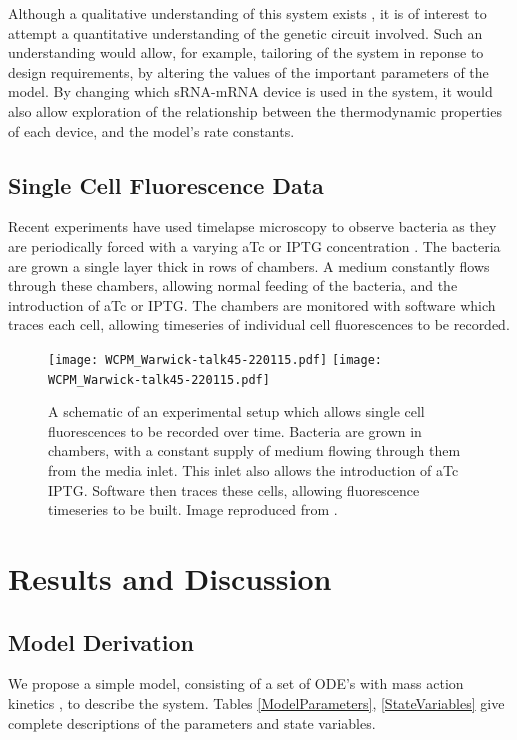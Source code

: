 \documentclass[10pt,journal]{./IEEE_latex_class/IEEEtran}
\begin{document}
Although a qualitative understanding of this system exists \cite{Rodrigo2012}, it is of interest to attempt a quantitative understanding of the genetic circuit involved. Such an understanding would allow, for example, tailoring of the system in reponse to design requirements, by altering the values of the important parameters of the model. By changing which sRNA-mRNA device is used in the system, it would also allow exploration of the relationship between the thermodynamic properties of each device, and the model's rate constants.
 
\subsection{Single Cell Fluorescence Data}

Recent experiments have used timelapse microscopy to observe bacteria as they are periodically forced with a varying aTc or IPTG concentration \cite{Jaramillo}. The bacteria are grown a single layer thick in rows of chambers. A medium constantly flows through these chambers, allowing normal feeding of the bacteria, and the introduction of aTc or IPTG. The chambers are monitored with software which traces each cell, allowing timeseries of individual cell fluorescences to be recorded.

\begin{figure}[H]
\centering
\texttt{[image: WCPM\_Warwick-talk45-220115.pdf]}
\centering
\texttt{[image: WCPM\_Warwick-talk45-220115.pdf]}
\caption{A schematic of an experimental setup which allows single cell fluorescences to be recorded over time. Bacteria are grown in chambers, with a constant supply of medium flowing through them from the media inlet. This inlet also allows the introduction of aTc IPTG. Software then traces these cells, allowing fluorescence timeseries to be built.  Image reproduced from \cite{Jaramillo}.}
\label{reactionscheme}
\end{figure}




\section{Results and Discussion}
\label{Results and Discussion}


\subsection{Model Derivation}
We propose a simple model, consisting of a set of ODE's with mass action kinetics \cite{UriAlon}, to describe the system. Tables \ref{ModelParameters}, \ref{StateVariables} give complete descriptions of the parameters and state variables.
 
\end{document}
